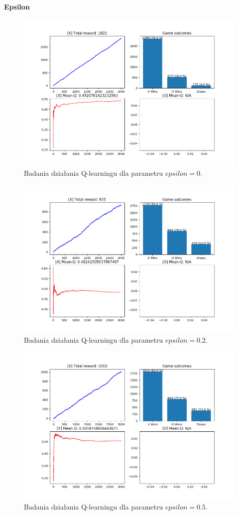 \pagebreak

\textbf{Epsilon}
\begin{figure}[H]
	\centering
	\includegraphics[width=0.7\linewidth]{imgs/q_learning/analysis/no_batch/eps/eps_0}
	\caption{Badania działania Q-learningu dla parametru $epsilon = 0$.}
\end{figure}

\begin{figure}[H]
	\centering
	\includegraphics[width=0.7\linewidth]{imgs/q_learning/analysis/no_batch/eps/eps_02}
	\caption{Badania działania Q-learningu dla parametru $epsilon = 0.2$.}
\end{figure}

\begin{figure}[H]
	\centering
	\includegraphics[width=0.7\linewidth]{imgs/q_learning/analysis/no_batch/eps/eps_05}
	\caption{Badania działania Q-learningu dla parametru $epsilon = 0.5$.}
\end{figure}

